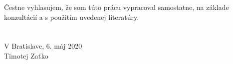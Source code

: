 \thispagestyle{empty}
\mbox{}\vfill
\noindent Čestne vyhlasujem, že som túto prácu vypracoval samostatne, na základe konzultácií a s použitím uvedenej literatúry.
\\
\\
\\

\noindent V Bratislave, 6. máj 2020\\

\hfill Timotej Zaťko \hspace{6mm}

\newpage\null\thispagestyle{empty}\newpage

